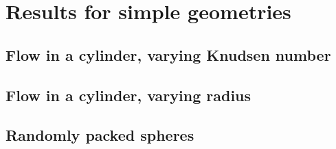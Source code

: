 \section{Results for simple geometries}
\subsection{Flow in a cylinder, varying Knudsen number}
\subsection{Flow in a cylinder, varying radius}
\subsection{Randomly packed spheres}